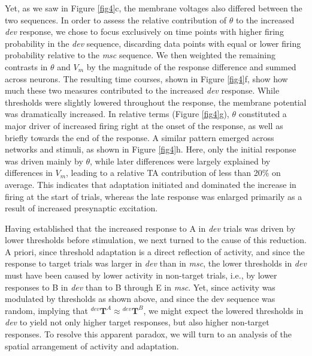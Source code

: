 \documentclass[pdflatex,referee,iicol,sn-basic]{sn-jnl}
\newcommand{\dev}{\textit{dev}}
\newcommand{\msc}{\textit{msc}}
\renewcommand{\T}[3][]{{}^{#1}_{}\mathbf{T}^{#2}_{#3}}
\newcommand{\refpanel}[2]{Figure \ref{fig#1}\lowercase{#2}}
\begin{document}
Yet, as we saw in \refpanel{4}{c}, the membrane voltages also differed between the two sequences. In order to assess the relative contribution of $\theta$ to the increased \dev{} response, we chose to focus exclusively on time points with higher firing probability in the \dev{} sequence, discarding data points with equal or lower firing probability relative to the \msc{} sequence. We then weighted the remaining contrasts in $\theta$ and $V_m$ by the magnitude of the response difference and summed across neurons. The resulting time courses, shown in \refpanel{4}{f}, show how much these two measures contributed to the increased \dev{} response. While thresholds were slightly lowered throughout the response, the membrane potential was dramatically increased. In relative terms (\refpanel{4}{g}), $\theta$ constituted a major driver of increased firing right at the onset of the response, as well as briefly towards the end of the response. A similar pattern emerged across networks and stimuli, as shown in \refpanel{4}{h}. Here, only the initial response was driven mainly by $\theta$, while later differences were largely explained by differences in $V_m$, leading to a relative TA contribution of less than 20\% on average. This indicates that adaptation initiated and dominated the increase in firing at the start of trials, whereas the late response was enlarged primarily as a result of increased presynaptic excitation.

Having established that the increased response to A in \dev{} trials was driven by lower thresholds before stimulation, we next turned to the cause of this reduction. A priori, since threshold adaptation is a direct reflection of activity, and since the response to target trials was larger in \dev{} than in \msc{}, the lower thresholds in \dev{} must have been caused by lower activity in non-target trials, i.e., by lower responses to B in \dev{} than to B through E in \msc{}. Yet, since activity was modulated by thresholds as shown above, and since the dev sequence was random, implying that $\T[dev]{A}{} \approx \T[dev]{B}{}$, we might expect the lowered thresholds in \dev{} to yield not only higher target responses, but also higher non-target responses. To resolve this apparent paradox, we will turn to an analysis of the spatial arrangement of activity and adaptation.
\end{document}
